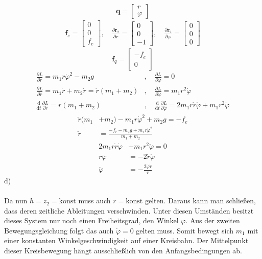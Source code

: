 \[
	\textbf{q} = \begin{bmatrix}
	r \\
	\varphi
	\end{bmatrix}
\]
\begin{align*}
		\textbf{f}_e = \begin{bmatrix}
	0 \\
	0 \\
	f_e
	\end{bmatrix}
	, \quad
	\frac{\partial \textbf{r}_2}{\partial r} = \begin{bmatrix}
	0 \\
	0 \\
	-1
	\end{bmatrix}
	, \quad
	\frac{\partial \textbf{r}_2}{\partial \varphi} = \begin{bmatrix}
	0 \\
	0 \\
	0
	\end{bmatrix}
\end{align*}
\[
	\textbf{f}_q = \begin{bmatrix}
	-f_e \\
	0
	\end{bmatrix}
\]
\begin{align*}
	\frac{\partial L}{\partial r} = m_1r\dot{\varphi}^2 - m_2g &,\quad \frac{\partial L}{\partial \varphi} = 0 \\
	\frac{\partial L}{\partial \dot{r}} = m_1\dot{r} + m_2\dot{r} = \dot{r}(m_1 + m_2) &,\quad \frac{\partial L}{\partial \dot{\varphi}} = m_1r^2\dot{\varphi} \\
	\frac{\text{d}}{\text{d}t}\frac{\partial L}{\partial \dot{r}} = \ddot{r}(m_1 + m_2) &, \quad \frac{\text{d}}{\text{d}t}\frac{\partial L}{\partial \dot{\varphi}} = 2m_1r\dot{r}\dot{\varphi} + m_1r^2\ddot{\varphi}
\end{align*}
\begin{align*}
	\ddot{r}(m_1 &+ m_2) -  m_1r\dot{\varphi}^2 + m_2g = -f_e \\
	\ddot{r} &= \frac{-f_e - m_2g + m_1r\dot{\varphi}^2}{m_1 + m_2}
\end{align*}
\begin{align*}
	2m_1r\dot{r}\dot{\varphi} &+ m_1r^2\ddot{\varphi} = 0 \\
	r\ddot{\varphi} &= -2\dot{r}\dot{\varphi} \\
	\ddot{\varphi} &= -\frac{2\dot{\varphi}\dot{r}}{r}
\end{align*}
d)\\ \\
Da nun $h = z_2 = \text{konst}$ muss auch $r = \text{konst}$ gelten. Daraus kann man schließen, dass deren zeitliche Ableitungen verschwinden. Unter diesen Umständen besitzt dieses System nur noch einen Freiheitsgrad, den Winkel $\varphi$. Aus der zweiten Bewegungsgleichung folgt das auch $\dot{\varphi} = 0$ gelten muss. Somit bewegt sich $m_1$ mit einer konstanten Winkelgeschwindigkeit auf einer Kreisbahn. Der Mittelpunkt dieser Kreisbewegung hängt ausschließlich von den Anfangsbedingungen ab.